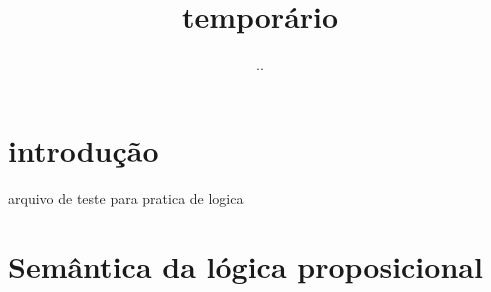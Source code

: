 \documentclass{article}
\title{temporário}
\author{..}
\begin{document}
\maketitle

\section{introdução}

arquivo de teste para pratica de logica

\section{Semântica da lógica proposicional}
\end{document}
